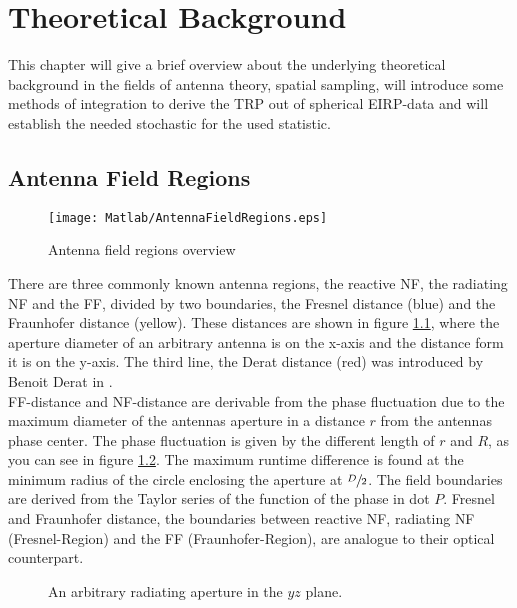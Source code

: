 \chapter{Theoretical Background}

This chapter will give a brief overview about the underlying theoretical background in the fields of antenna theory, spatial sampling, will introduce some methods of integration to derive the \ac{TRP} out of spherical \ac{EIRP}-data and will establish the needed stochastic for the used statistic.

\section{Antenna Field Regions}

\begin{figure}[H]
\centering
\texttt{[image: Matlab/AntennaFieldRegions.eps]}
\caption{Antenna field regions overview}
\label{fig:antennafieldreg}
\end{figure}

There are three commonly known antenna regions, the reactive \ac{NF}, the radiating \ac{NF} and the \ac{FF}, divided by two boundaries, the Fresnel distance (blue) and the Fraunhofer distance (yellow). These distances are shown in figure \ref{fig:antennafieldreg}, where the aperture diameter of an arbitrary antenna is on the x-axis and the distance form it is on the y-axis. The third line, the Derat distance (red) was introduced by Benoit Derat in \cite{8393926}.\\
\ac{FF}-distance and \ac{NF}-distance are derivable from the phase fluctuation due to the maximum diameter of the antennas aperture \cite{7942128} in a distance $r$ from the antennas phase center. The phase fluctuation is given by the different length of $r$ and $R$, as you can see in figure \ref{fig:arbaperturexy}. The maximum runtime difference is found at the minimum radius of the circle enclosing the aperture at $\sfrac{D}{2}$. The field boundaries are derived from the Taylor series of the function of the phase in dot $P$. Fresnel and Fraunhofer distance, the boundaries between reactive \ac{NF}, radiating \ac{NF} (Fresnel-Region) and the \ac{FF} (Fraunhofer-Region), are analogue to their optical counterpart. \cite{7942128} \cite{balanis}

\begin{figure}[H]
\centering
\def\svgwidth{0.6\textwidth}

\caption{An arbitrary radiating aperture in the $yz$ plane. \cite{7942128}}
\label{fig:arbaperturexy}
\end{figure}

